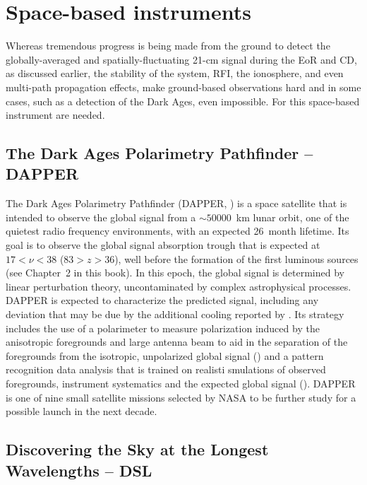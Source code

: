 \section{Space-based instruments}

Whereas tremendous progress is being made from the ground to detect the globally-averaged and spatially-fluctuating 21-cm signal during the EoR and CD, as discussed earlier, the stability of the system, RFI, the ionosphere, and even multi-path propagation effects, make ground-based observations hard and in some cases, such as a detection of the Dark Ages, even impossible. For this space-based instrument are needed. 

\subsection{The Dark Ages Polarimetry Pathfinder -- DAPPER}

The Dark Ages Polarimetry Pathfinder (DAPPER, \cite{burns19}) is a space satellite that is intended to observe the global signal from a $\sim 50000$~km lunar orbit, one of the quietest radio frequency environments, with an expected 26~month lifetime. Its goal is to observe the global signal absorption trough that is expected at $17 < \nu < 38$ ($83 > z > 36$), well before the formation of the first luminous sources (see Chapter~2 in this book). In this epoch, the global signal is determined by linear perturbation theory, uncontaminated by complex astrophysical processes. DAPPER is expected to characterize the predicted signal, including any deviation that may be due by the additional cooling reported by \cite{bowman18}. Its strategy includes the use of a polarimeter to measure polarization induced by the anisotropic foregrounds and large antenna beam to aid in the separation of the foregrounds from the isotropic, unpolarized global signal (\cite{nhan17}) and a pattern recognition data analysis that is trained on realisti smulations of observed foregrounds, instrument systematics and the expected global signal (\cite{tauscher18}).
%
DAPPER is one of nine small satellite missions selected by NASA to be further study for a possible launch in the next decade.



\subsection{Discovering the Sky at the Longest Wavelengths -- DSL}

